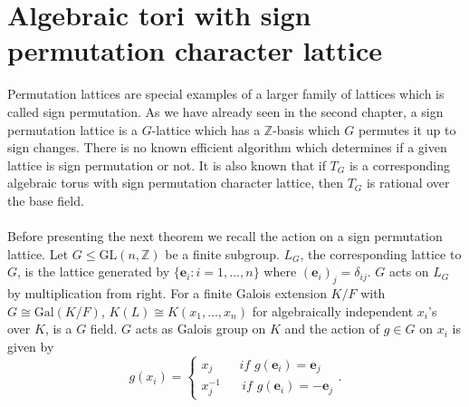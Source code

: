 \documentclass[12pt]{article}
\theoremstyle{plain}
\newcommand{\Z}{\ensuremath{\mathbb{Z}}}
\begin{document}
\section{Algebraic tori with sign permutation character lattice}
Permutation lattices are special examples of a larger family of lattices which is called sign permutation. As we have already seen in the second chapter, a sign permutation lattice is a $G$-lattice which has a $\Z$-basis which $G$ permutes it up to sign changes. There is no known efficient algorithm which determines if a given lattice is sign permutation or not. It is also known that if $T_G$ is a corresponding algebraic torus with sign permutation character lattice, then $T_G$ is rational over the base field. \\
\\
Before presenting the next theorem we recall the action on a sign permutation lattice. Let $G \leq \mathrm{GL}(n,\Z)$ be a finite subgroup. $L_G$, the corresponding lattice to $G$, is the lattice generated by $\lbrace \textbf{e}_i: i = 1, \ldots , n \rbrace$ where $(\textbf{e}_i)_j = \delta_{ij}$. $G$ acts on $L_G$ by multiplication from right. For a finite Galois extension $K/F$ with $G \cong \mathrm{Gal}(K/F)$, $K(L) \cong K(x_1, \ldots, x_n)$ for algebraically independent $x_i$'s over $K$, is a $G$ field. $G$ acts as Galois group on $K$ and the action of $g \in G$ on $x_i$ is given by $$g(x_i) = \begin{cases} x_j \hspace{25pt} if \,\, g(\textbf{e}_i) = \textbf{e}_j \\
x^{-1}_j \hspace{20pt} if \,\, g(\textbf{e}_i) = -\textbf{e}_j \end{cases}
.$$
\end{document}
